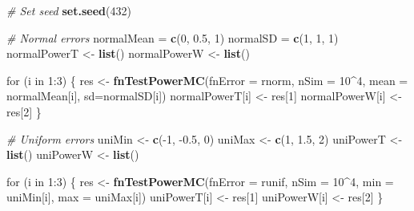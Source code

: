\documentclass[10pt,]{article}
\newenvironment{Shaded}{\begin{snugshade}}{\end{snugshade}}
\newcommand{\KeywordTok}[1]{\textcolor[rgb]{0.13,0.29,0.53}{\textbf{{#1}}}}
\newcommand{\DataTypeTok}[1]{\textcolor[rgb]{0.13,0.29,0.53}{{#1}}}
\newcommand{\DecValTok}[1]{\textcolor[rgb]{0.00,0.00,0.81}{{#1}}}
\newcommand{\FloatTok}[1]{\textcolor[rgb]{0.00,0.00,0.81}{{#1}}}
\newcommand{\StringTok}[1]{\textcolor[rgb]{0.31,0.60,0.02}{{#1}}}
\newcommand{\CommentTok}[1]{\textcolor[rgb]{0.56,0.35,0.01}{\textit{{#1}}}}
\newcommand{\NormalTok}[1]{{#1}}
\begin{document}
\begin{Shaded}
\begin{Highlighting}[]
\CommentTok{# Set seed}
\KeywordTok{set.seed}\NormalTok{(}\DecValTok{432}\NormalTok{)}

\CommentTok{# Normal errors}
\NormalTok{normalMean =}\StringTok{ }\KeywordTok{c}\NormalTok{(}\DecValTok{0}\NormalTok{, }\FloatTok{0.5}\NormalTok{, }\DecValTok{1}\NormalTok{)}
\NormalTok{normalSD =}\StringTok{ }\KeywordTok{c}\NormalTok{(}\DecValTok{1}\NormalTok{, }\DecValTok{1}\NormalTok{, }\DecValTok{1}\NormalTok{)}
\NormalTok{normalPowerT <-}\StringTok{ }\KeywordTok{list}\NormalTok{()}
\NormalTok{normalPowerW <-}\StringTok{ }\KeywordTok{list}\NormalTok{()}

\NormalTok{for (i in }\DecValTok{1}\NormalTok{:}\DecValTok{3}\NormalTok{) \{}
  \NormalTok{res <-}\StringTok{ }\KeywordTok{fnTestPowerMC}\NormalTok{(}\DataTypeTok{fnError =} \NormalTok{rnorm, }\DataTypeTok{nSim =} \DecValTok{10}\NormalTok{^}\DecValTok{4}\NormalTok{,}
                       \DataTypeTok{mean =} \NormalTok{normalMean[i], }\DataTypeTok{sd=}\NormalTok{normalSD[i])}
  \NormalTok{normalPowerT[i] <-}\StringTok{ }\NormalTok{res[}\DecValTok{1}\NormalTok{]}
  \NormalTok{normalPowerW[i] <-}\StringTok{ }\NormalTok{res[}\DecValTok{2}\NormalTok{]}
\NormalTok{\}}

\CommentTok{# Uniform errors}
\NormalTok{uniMin <-}\StringTok{ }\KeywordTok{c}\NormalTok{(-}\DecValTok{1}\NormalTok{, -}\FloatTok{0.5}\NormalTok{, }\DecValTok{0}\NormalTok{)}
\NormalTok{uniMax <-}\StringTok{ }\KeywordTok{c}\NormalTok{(}\DecValTok{1}\NormalTok{, }\FloatTok{1.5}\NormalTok{, }\DecValTok{2}\NormalTok{)}
\NormalTok{uniPowerT <-}\StringTok{ }\KeywordTok{list}\NormalTok{()}
\NormalTok{uniPowerW <-}\StringTok{ }\KeywordTok{list}\NormalTok{()}

\NormalTok{for (i in }\DecValTok{1}\NormalTok{:}\DecValTok{3}\NormalTok{) \{}
  \NormalTok{res <-}\StringTok{ }\KeywordTok{fnTestPowerMC}\NormalTok{(}\DataTypeTok{fnError =} \NormalTok{runif, }\DataTypeTok{nSim =} \DecValTok{10}\NormalTok{^}\DecValTok{4}\NormalTok{,}
                       \DataTypeTok{min =} \NormalTok{uniMin[i], }\DataTypeTok{max =} \NormalTok{uniMax[i])}
  \NormalTok{uniPowerT[i] <-}\StringTok{ }\NormalTok{res[}\DecValTok{1}\NormalTok{]}
  \NormalTok{uniPowerW[i] <-}\StringTok{ }\NormalTok{res[}\DecValTok{2}\NormalTok{]}
\NormalTok{\}}


\end{Highlighting}
\end{Shaded}
\end{document}
